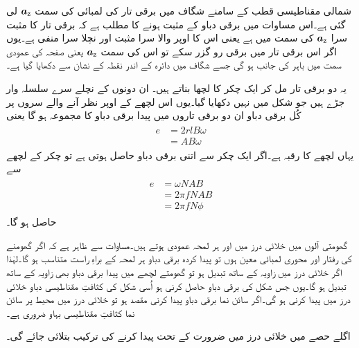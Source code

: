 شمالی مقناطیسی قطب کے سامنے شگاف میں برقی تار کی لمبائی کی سمت ${\boldsymbol{a}}_{\textup{z}}$ لی گئی ہے۔اس مساوات میں برقی دباو کے مثبت ہونے کا مطلب ہے کہ برقی تار کا مثبت سرا ${\boldsymbol{a}}_{\textup{z}}$ کی سمت میں ہے یعنی اس کا اوپر والا سرا مثبت اور نچلا  سرا منفی ہے۔یوں اگر اس برقی تار میں برقی رو گزر سکے تو اس کی سمت ${\boldsymbol{a}}_{\textup{z}}$ یعنی صفحہ کی عمودی سمت میں باہر کی جانب ہو گی جسے شگاف میں دائرہ کے اندر نقطہ کے نشان سے دکھایا گیا ہے۔ 

یہ دو برقی تار مل کر ایک چکر کا لچھا بناتے ہیں۔ ان دونوں کے نچلے سرے سلسلہ وار جڑے ہیں جو شکل میں نہیں دکھایا گیا۔یوں اس لچھے کے اوپر نظر آنے والے سروں پر کُل برقی دباو  ان دو برقی تاروں میں پیدا برقی دباو  کا مجموعہ ہو گا یعنی
\begin{gather}
\begin{aligned}
e&=2r l B \omega\\
&=A B \omega
\end{aligned}
\end{gather}
یہاں لچھے کا رقبہ   ہے۔اگر ایک چکر سے اتنی برقی دباو حاصل ہوتی ہے تو  چکر کے لچھے  سے
\begin{gather}
\begin{aligned}\label{مساوات_گھومتے_مشین_پیدا_دباو}
e&=\omega N A B\\
&=2 \pi f N A B\\
&=2 \pi f N \phi
\end{aligned}
\end{gather}
حاصل ہو گا۔

گھومتی آلوں میں خلائی درز میں   اور   ہر لمحہ عمودی ہوتے ہیں۔مساوات   سے ظاہر ہے کہ اگر گھومنے کی رفتار اور محوری لمبائی معین ہوں تو پیدا کردہ برقی دباو  ہر لمحہ   کے براہِ راست متناسب ہو گا۔لہٰذا اگر خلائی درز میں زاویہ کے ساتھ   تبدیل ہو تو گھومتے لچھے میں پیدا برقی دباو بھی زاویہ کے ساتھ تبدیل ہو گا۔یوں جس شکل کی برقی دباو حاصل کرنی ہو اُسی شکل کی کثافتِ مقناطیسی دباو خلائی درز میں پیدا کرنی ہو گی۔اگر سائن نما برقی دباو پیدا کرنی مقصد ہو تو خلائی درز میں محیط پر سائن نما کثافتِ مقناطیسی بہاو ضروری ہے۔

اگلے حصے میں خلائی درز میں ضرورت کے تحت   پیدا کرنے کی ترکیب بتلائی جائے گی۔

